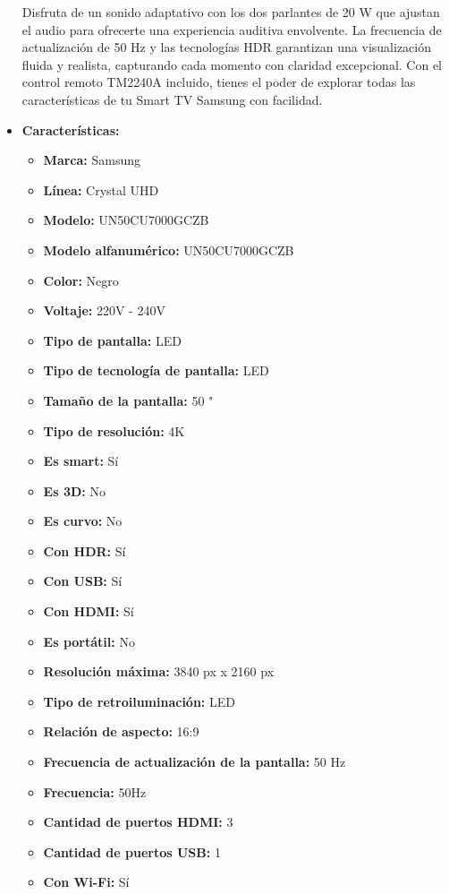\documentclass{article}
\begin{document}
\begin{adjustwidth}{2em}{}
\begin{itemize}
Disfruta de un sonido adaptativo con los dos parlantes de 20 W que ajustan el audio para ofrecerte una experiencia auditiva envolvente. La frecuencia de actualización de 50 Hz y las tecnologías HDR garantizan una visualización fluida y realista, capturando cada momento con claridad excepcional. Con el control remoto TM2240A incluido, tienes el poder de explorar todas las características de tu Smart TV Samsung con facilidad.
    \item \textbf{Características:} 
    \begin{itemize}
        \item \textbf {Marca:} Samsung
    \item \textbf {Línea:} Crystal UHD
    \item \textbf {Modelo:} UN50CU7000GCZB
    \item \textbf {Modelo alfanumérico:} UN50CU7000GCZB
    \item \textbf {Color:} Negro
    \item \textbf {Voltaje:} 220V - 240V
    \item \textbf {Tipo de pantalla:} LED
    \item \textbf {Tipo de tecnología de pantalla:} LED
    \item \textbf {Tamaño de la pantalla:} 50 "
    \item \textbf {Tipo de resolución:} 4K
    \item \textbf {Es smart:} Sí
    \item \textbf {Es 3D:} No
    \item \textbf {Es curvo:} No
    \item \textbf {Con HDR:} Sí
    \item \textbf {Con USB:} Sí
    \item \textbf {Con HDMI:} Sí
    \item \textbf {Es portátil:} No
    \item \textbf {Resolución máxima:} 3840 px x 2160 px
    \item \textbf {Tipo de retroiluminación:} LED
    \item \textbf {Relación de aspecto:} 16:9
    \item \textbf {Frecuencia de actualización de la pantalla:} 50 Hz
    \item \textbf {Frecuencia:} 50Hz
    \item \textbf {Cantidad de puertos HDMI:} 3
    \item \textbf {Cantidad de puertos USB:} 1
    \item \textbf {Con Wi-Fi:} Sí

\end{itemize}
\end{itemize}
\end{adjustwidth}
\end{document}
